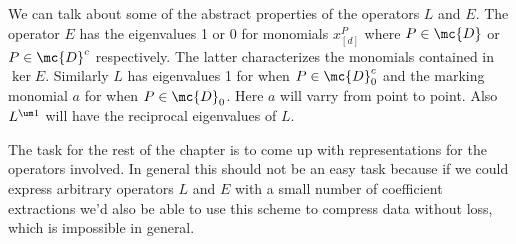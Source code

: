 We can talk about some of the abstract properties of the operators $L$ and $E$. The operator $E$ has the eigenvalues 1 or 0 for monomials $x_{[d]}^P$ where $P \in \mc{D}$ or $P \in \mc{D}^c$ respectively. The latter characterizes the monomials contained in $\ker E$. Similarly $L$ has eigenvalues 1 for when $P \in \mc{D}_0^c$ and the marking monomial $a$ for when $P\in \mc{D}_0$. Here $a$ will varry from point to point. Also $L^{\um 1}$ will have the reciprocal eigenvalues of $L$.

The task for the rest of the chapter is to come up with representations for the operators involved. In general this should not be an easy task because if we could express arbitrary operators $L$ and $E$ with a small number of coefficient extractions we'd also be able to use this scheme to compress data without loss, which is impossible in general.

